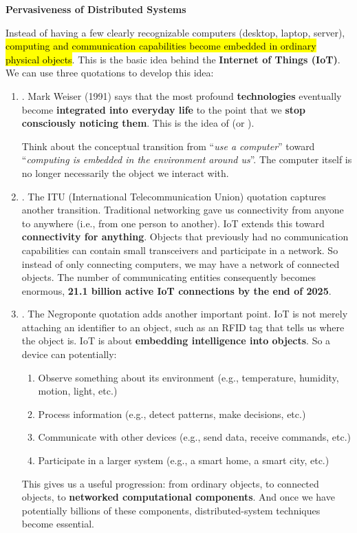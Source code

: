 \highspace
\begin{flushleft}
    \textcolor{Red2}{ \textbf{Pervasiveness of Distributed Systems}}
\end{flushleft}
Instead of having a few clearly recognizable computers (desktop, laptop, server), \hl{computing and communication capabilities become embedded in ordinary physical objects}. This is the basic idea behind the \textbf{Internet of Things (IoT)}. We can use three quotations to develop this idea:
\begin{enumerate}
    \item {}. Mark Weiser (1991) says that the most profound \textbf{technologies} eventually become \textbf{integrated into everyday life} to the point that we \textbf{stop consciously noticing them}. This is the idea of  (or ).

        Think about the conceptual transition from ``\emph{use a computer}'' toward ``\emph{computing is embedded in the environment around us}''. The computer itself is no longer necessarily the object we interact with.

    \item {}. The ITU (International Telecommunication Union) quotation captures another transition. Traditional networking gave us connectivity from anyone to anywhere (i.e., from one person to another). IoT extends this toward \textbf{connectivity for anything}. Objects that previously had no communication capabilities can contain small transceivers and participate in a network. So instead of only connecting computers, we may have a network of connected objects. The number of communicating entities consequently becomes enormous, \textbf{21.1 billion active IoT connections by the end of 2025}.

    \item {}. The Negroponte quotation adds another important point. IoT is not merely attaching an identifier to an object, such as an RFID tag that tells us where the object is. IoT is about \textbf{embedding intelligence into objects}. So a device can potentially:
        \begin{enumerate}
            \item Observe something about its environment (e.g., temperature, humidity, motion, light, etc.)
            \item Process information (e.g., detect patterns, make decisions, etc.)
            \item Communicate with other devices (e.g., send data, receive commands, etc.)
            \item Participate in a larger system (e.g., a smart home, a smart city, etc.)
        \end{enumerate}
        This gives us a useful progression: from ordinary objects, to connected objects, to \textbf{networked computational components}. And once we have potentially billions of these components, distributed-system techniques become essential.
\end{enumerate}

